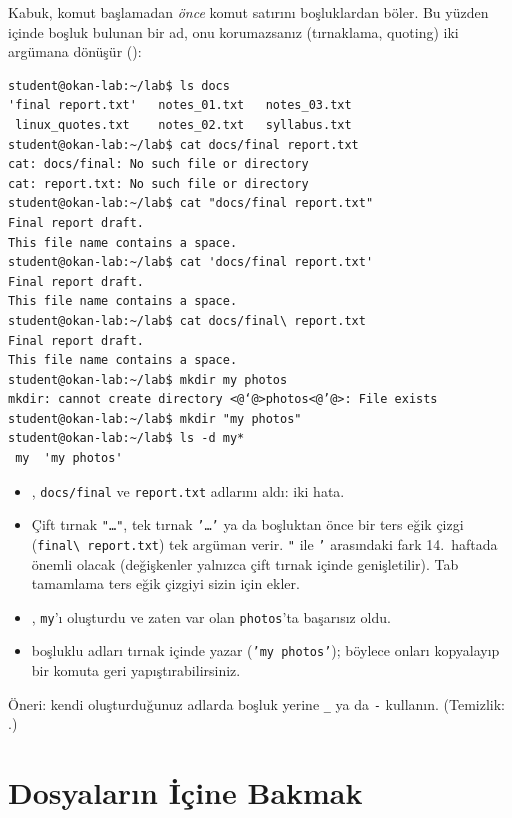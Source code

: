 Kabuk, komut başlamadan \emph{önce} komut satırını boşluklardan böler. Bu yüzden içinde boşluk bulunan bir ad, onu korumazsanız (tırnaklama, quoting) iki argümana dönüşür ():

\begin{lstlisting}[style=term]
student@okan-lab:~/lab$ ls docs
'final report.txt'   notes_01.txt   notes_03.txt
 linux_quotes.txt    notes_02.txt   syllabus.txt
student@okan-lab:~/lab$ cat docs/final report.txt
cat: docs/final: No such file or directory
cat: report.txt: No such file or directory
student@okan-lab:~/lab$ cat "docs/final report.txt"
Final report draft.
This file name contains a space.
student@okan-lab:~/lab$ cat 'docs/final report.txt'
Final report draft.
This file name contains a space.
student@okan-lab:~/lab$ cat docs/final\ report.txt
Final report draft.
This file name contains a space.
student@okan-lab:~/lab$ mkdir my photos
mkdir: cannot create directory <@‘@>photos<@’@>: File exists
student@okan-lab:~/lab$ mkdir "my photos"
student@okan-lab:~/lab$ ls -d my*
 my  'my photos'
\end{lstlisting}

\begin{itemize}
  \item {}, \texttt{docs/final} ve \texttt{report.txt} adlarını aldı: iki hata.
  \item Çift tırnak \texttt{"\dots"}, tek tırnak \texttt{'\dots'} ya da boşluktan önce bir ters eğik çizgi (\texttt{final\textbackslash\ report.txt}) tek argüman verir. \texttt{"} ile \texttt{'} arasındaki fark 14.~haftada önemli olacak (değişkenler yalnızca çift tırnak içinde genişletilir). Tab tamamlama ters eğik çizgiyi sizin için ekler.
  \item {}, \texttt{my}'ı oluşturdu ve zaten var olan \texttt{photos}'ta başarısız oldu.
  \item {} boşluklu adları tırnak içinde yazar (\texttt{'my photos'}); böylece onları kopyalayıp bir komuta geri yapıştırabilirsiniz.
\end{itemize}
Öneri: kendi oluşturduğunuz adlarda boşluk yerine \texttt{\_} ya da \texttt{-} kullanın. (Temizlik: .)

\section{Dosyaların İçine Bakmak}

